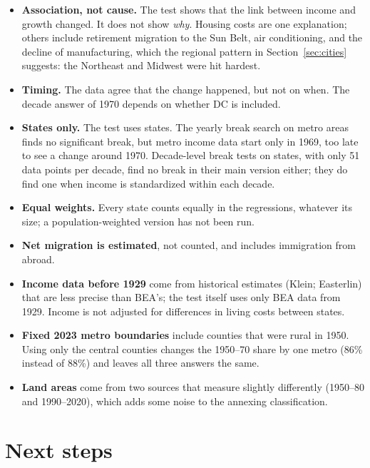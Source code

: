\documentclass[11pt]{article}
\begin{document}
\begin{itemize}
  \item \textbf{Association, not cause.} The test shows that the link between income and growth
        changed. It does not show \emph{why}. Housing costs are one explanation; others include
        retirement migration to the Sun Belt, air conditioning, and the decline of manufacturing,
        which the regional pattern in Section~\ref{sec:cities} suggests: the Northeast and Midwest
        were hit hardest.
  \item \textbf{Timing.} The data agree that the change happened, but not on when. The decade
        answer of 1970 depends on whether DC is included.
  \item \textbf{States only.} The test uses states. The yearly break search on metro areas finds no
        significant break, but metro income data start only in 1969, too late to see a change around
        1970. Decade-level break tests on states, with only 51 data points per decade, find no break in
        their main version either; they do find one when income is standardized within each decade.
  \item \textbf{Equal weights.} Every state counts equally in the regressions, whatever its size;
        a population-weighted version has not been run.
  \item \textbf{Net migration is estimated}, not counted, and includes immigration from abroad.
  \item \textbf{Income data before 1929} come from historical estimates (Klein; Easterlin) that are
        less precise than BEA's; the test itself uses only BEA data from 1929. Income is not adjusted
        for differences in living costs between states.
  \item \textbf{Fixed 2023 metro boundaries} include counties that were rural in 1950. Using only
        the central counties changes the 1950--70 share by one metro (86\% instead of 88\%) and leaves
        all three answers the same.
  \item \textbf{Land areas} come from two sources that measure slightly differently (1950--80 and
        1990--2020), which adds some noise to the annexing classification.
\end{itemize}

\section{Next steps}
\end{document}
